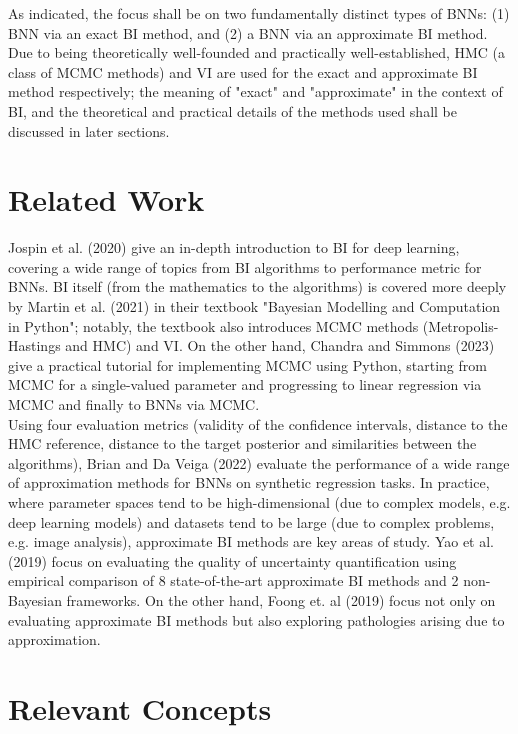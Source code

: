 \documentclass[conference]{IEEEtran}
\begin{document}
As indicated, the focus shall be on two fundamentally distinct types of BNNs: (1) BNN via an exact BI method, and (2) a BNN via an approximate BI method. Due to being theoretically well-founded and practically well-established, HMC (a class of MCMC methods) and VI are used for the exact and approximate BI method respectively; the meaning of "exact" and "approximate" in the context of BI, and the theoretical and practical details of the methods used shall be discussed in later sections.\\

\section{Related Work}
Jospin et al. (2020) give an in-depth introduction to BI for deep learning, covering a wide range of topics from BI algorithms to performance metric for BNNs. BI itself (from the mathematics to the algorithms) is covered more deeply by Martin et al. (2021) in their textbook "Bayesian Modelling and Computation in Python"; notably, the textbook also introduces MCMC methods (Metropolis-Hastings and HMC) and VI. On the other hand, Chandra and Simmons (2023) give a practical tutorial for implementing MCMC using Python, starting from MCMC for a single-valued parameter and progressing to linear regression via MCMC and finally to BNNs via MCMC.\\

Using four evaluation metrics (validity of the confidence intervals, distance to the HMC reference, distance to the target posterior and similarities between the algorithms), Brian and Da Veiga (2022) evaluate the performance of a wide range of approximation methods for BNNs on synthetic regression tasks. In practice, where parameter spaces tend to be high-dimensional (due to complex models, e.g. deep learning models) and datasets tend to be large (due to complex problems, e.g. image analysis), approximate BI methods are key areas of study. Yao et al. (2019) focus on evaluating the quality of uncertainty quantification using empirical comparison of 8 state-of-the-art approximate BI methods and 2 non-Bayesian frameworks. On the other hand, Foong et. al (2019) focus not only on evaluating approximate BI methods but also exploring pathologies arising due to approximation.

\section{Relevant Concepts}
\end{document}
